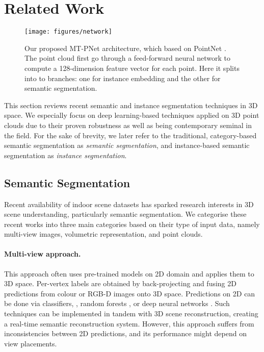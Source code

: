 \documentclass[10pt,twocolumn,letterpaper]{article}
\begin{document}
 \section{Related Work}
\label{sec:related}

\begin{figure*}[t]
    \centering
    \texttt{[image: figures/network]}
    \caption{Our proposed MT-PNet architecture, which based on PointNet
      \cite{qi-pointnet-cvpr17}. The point cloud first go through a feed-forward
      neural network to compute a 128-dimension feature vector for each
      point. Here it splits into to branches: one for instance embedding and the
      other for semantic segmentation.}
    \label{fig:network}
\end{figure*}

This section reviews recent semantic and instance segmentation techniques in 3D
space. We especially focus on deep learning-based techniques applied on 3D point
clouds due to their proven robustness as well as being contemporary seminal in
the field. For the sake of brevity, we later refer to the traditional,
category-based semantic segmentation as \emph{semantic segmentation}, and
instance-based semantic segmentation as \emph{instance segmentation}.

\subsection{Semantic Segmentation}

Recent availability of indoor scene datasets \cite{silberman-nyud-eccv12,
  hua-scenenn-3dv16, dai-scannet-cvpr17, armeni-s3dis-cvpr16} has sparked
research interests in 3D scene understanding, particularly semantic
segmentation. We categorise these recent works into three main categories based
on their type of input data, namely multi-view images, volumetric
representation, and point clouds.

\paragraph{Multi-view approach.}
This approach often uses pre-trained models on 2D domain and applies them to 3D
space. Per-vertex labels are obtained by back-projecting and fusing 2D
predictions from colour or RGB-D images onto 3D space. Predictions on 2D can be
done via classifiers, \eg, random forests \cite{hermans-dense-icra14,
  riemenschneider-multiview-eccv14, wolf-fast-icra15,
  vineet-incremental-icra15}, or deep neural networks
\cite{mccormac-semanticfusion-icra17, yang-occupancy-iros17,
  pham-rpss-wacv19}. Such techniques can be implemented in tandem with 3D scene
reconstruction, creating a real-time semantic reconstruction system. However,
this approach suffers from inconsistencies between 2D predictions, and its
performance might depend on view placements.
\end{document}
